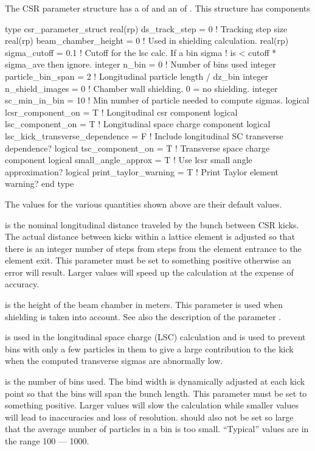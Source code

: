 The CSR parameter structure has a 
of  and an  of .
This structure has components
\begin{example}
  type csr_parameter_struct 
    real(rp) ds_track_step = 0        ! Tracking step size
    real(rp) beam_chamber_height = 0  ! Used in shielding calculation.
    real(rp) sigma_cutoff = 0.1       ! Cutoff for the lsc calc. If a bin sigma
                                      !  is < cutoff * sigma_ave then ignore.
    integer n_bin = 0                 ! Number of bins used
    integer particle_bin_span = 2     ! Longitudinal particle length / dz_bin
    integer n_shield_images = 0       ! Chamber wall shielding. 0 = no shielding.
    integer sc_min_in_bin = 10        ! Min number of particle needed to compute sigmas.
    logical lcsr_component_on = T     ! Longitudinal csr component
    logical lsc_component_on = T      ! Longitudinal space charge component
    logical lsc_kick_transverse_dependence = F
                                      ! Include longitudinal SC transverse dependence?
    logical tsc_component_on = T      ! Transverse space charge component
    logical small_angle_approx = T    ! Use lcsr small angle approximation?
    logical print_taylor_warning = T  ! Print Taylor element warning?
  end type
\end{example}
The values for the various quantities shown above are their default values. 

 is the nominal longitudinal distance traveled by
the bunch between CSR kicks. The actual distance between kicks within
a lattice element is adjusted so that there is an integer number of
steps from steps from the element entrance to the element exit.  This
parameter must be set to something positive otherwise an error will
result. Larger values will speed up the calculation at the expense of
accuracy.

 is the height of the beam chamber in
meters. This parameter is used when shielding is taken into account.
See also the description of the parameter .

 is used in the longitudinal space charge (LSC)
calculation and is used to prevent bins with only a few particles in
them to give a large contribution to the kick when the computed
transverse sigmas are abnormally low.

 is the number of bins used. The bind width is dynamically
adjusted at each kick point so that the bins will span the bunch
length.  This parameter must be set to something positive. Larger
values will slow the calculation while smaller values will lead to
inaccuracies and loss of resolution.  should also not be set
so large that the average number of particles in a bin is too small. 
``Typical'' values are in the range 100 --- 1000.

